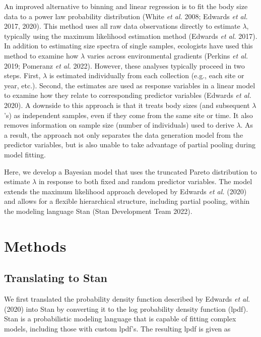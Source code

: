 \documentclass[
  12pt,
]{article}
\begin{document}
An improved alternative to binning and linear regression is to fit the
body size data to a power law probability distribution (White \emph{et
al.} 2008; Edwards \emph{et al.} 2017, 2020). This method uses all raw
data observations directly to estimate \(\lambda\), typically using the
maximum likelihood estimation method (Edwards \emph{et al.} 2017). In
addition to estimating size spectra of single samples, ecologists have
used this method to examine how \(\lambda\) varies across environmental
gradients (Perkins \emph{et al.} 2019; Pomeranz \emph{et al.} 2022).
However, these analyses typically proceed in two steps. First,
\(\lambda\) is estimated individually from each collection (e.g., each
site or year, etc.). Second, the estimates are used as response
variables in a linear model to examine how they relate to corresponding
predictor variables (Edwards \emph{et al.} 2020). A downside to this
approach is that it treats body sizes (and subsequent \(\lambda\)'s) as
independent samples, even if they come from the same site or time. It
also removes information on sample size (number of individuals) used to
derive \(\lambda\). As a result, the approach not only separates the
data generation model from the predictor variables, but is also unable
to take advantage of partial pooling during model fitting.

Here, we develop a Bayesian model that uses the truncated Pareto
distribution to estimate \(\lambda\) in response to both fixed and
random predictor variables. The model extends the maximum likelihood
approach developed by Edwards \emph{et al.} (2020) and allows for a
flexible hierarchical structure, including partial pooling, within the
modeling language Stan (Stan Development Team 2022).

\hypertarget{methods}{%
\section{Methods}\label{methods}}

\hypertarget{translating-to-stan}{%
\subsection{Translating to Stan}\label{translating-to-stan}}

We first translated the probability density function described by
Edwards \emph{et al.} (2020) into Stan by converting it to the log
probability density function (lpdf). Stan is a probabilistic modeling
language that is capable of fitting complex models, including those with
custom lpdf's. The resulting lpdf is given as
\end{document}
